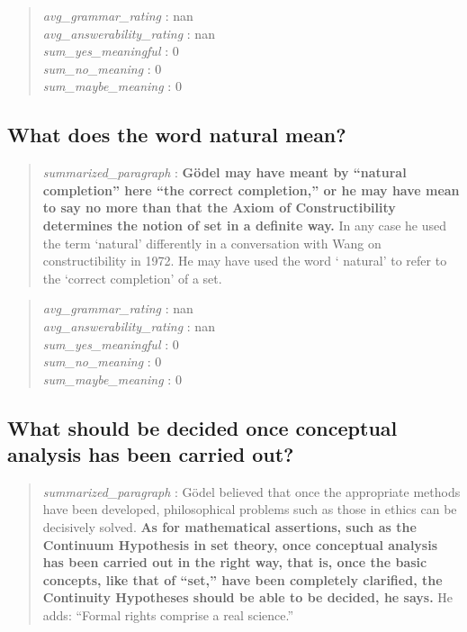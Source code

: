 \begin{quote}
\emph{avg\_grammar\_rating} : nan\\
\emph{avg\_answerability\_rating} : nan\\
\emph{sum\_yes\_meaningful} : 0\\
\emph{sum\_no\_meaning} : 0\\
\emph{sum\_maybe\_meaning} : 0
\end{quote}

\hypertarget{what-does-the-word-natural-mean}{%
\subsection{What does the word natural
mean?}\label{what-does-the-word-natural-mean}}

\begin{quote}
\emph{summarized\_paragraph} : \textbf{Gödel may have meant by ``natural
completion'' here ``the correct completion,'' or he may have mean to say
no more than that the Axiom of Constructibility determines the notion of
set in a definite way.} In any case he used the term `natural'
differently in a conversation with Wang on constructibility in 1972. He
may have used the word ` natural' to refer to the `correct completion'
of a set.
\end{quote}

\begin{quote}
\emph{avg\_grammar\_rating} : nan\\
\emph{avg\_answerability\_rating} : nan\\
\emph{sum\_yes\_meaningful} : 0\\
\emph{sum\_no\_meaning} : 0\\
\emph{sum\_maybe\_meaning} : 0
\end{quote}

\hypertarget{what-should-be-decided-once-conceptual-analysis-has-been-carried-out}{%
\subsection{What should be decided once conceptual analysis has been
carried
out?}\label{what-should-be-decided-once-conceptual-analysis-has-been-carried-out}}

\begin{quote}
\emph{summarized\_paragraph} : Gödel believed that once the appropriate
methods have been developed, philosophical problems such as those in
ethics can be decisively solved. \textbf{As for mathematical assertions,
such as the Continuum Hypothesis in set theory, once conceptual analysis
has been carried out in the right way, that is, once the basic concepts,
like that of ``set,'' have been completely clarified, the Continuity
Hypotheses should be able to be decided, he says.} He adds: ``Formal
rights comprise a real science.''
\end{quote}

